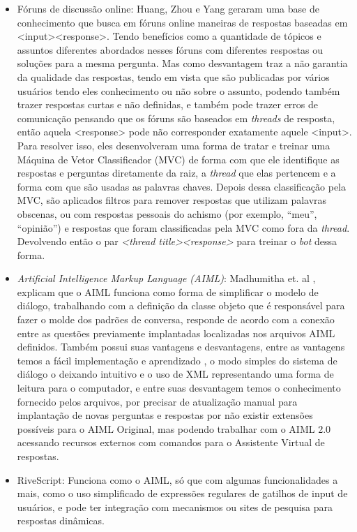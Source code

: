 \documentclass[
	12pt,				%
	oneside,
	a4paper,			%
	english,			%
	french,				%
	spanish,			%
	brazil				%
	]{abntex2}
\begin{document}
\begin{itemize}
	\item Fóruns de discussão online: Huang, Zhou e Yang\supercite{oline-foruns-database} geraram uma base de conhecimento que busca em fóruns online maneiras de respostas baseadas em <input><response>. Tendo benefícios como a quantidade de tópicos e assuntos diferentes abordados nesses fóruns com diferentes respostas ou soluções para a mesma pergunta. Mas como desvantagem traz a não garantia da qualidade das respostas, tendo em vista que são publicadas por vários usuários tendo eles conhecimento ou não sobre o assunto, podendo também trazer respostas curtas e não definidas, e também pode trazer erros de comunicação pensando que os fóruns são baseados em \emph{threads} de resposta, então aquela <response> pode não corresponder exatamente aquele <input>. Para resolver isso, eles desenvolveram uma forma de tratar e treinar uma Máquina de Vetor Classificador (MVC) de forma com que ele identifique as respostas e perguntas diretamente da raiz, a \emph{thread} que elas pertencem e a forma com que são usadas as palavras chaves. Depois dessa classificação pela MVC, são aplicados filtros para remover respostas que utilizam palavras obscenas, ou com respostas pessoais do achismo (por exemplo, “meu”, “opinião”) e respostas que foram classificadas pela MVC como fora da \emph{thread}. Devolvendo então o par \emph{<thread title><response>} para treinar o \emph{bot} dessa forma.

	\item \emph{Artificial Intelligence Markup Language (AIML)}: Madhumitha et. al \supercite{AIML}, explicam que o AIML funciona como forma de simplificar o modelo de diálogo, trabalhando com a definição da classe objeto que é responsável para fazer o molde dos padrões de conversa, responde de acordo com a conexão entre as questões previamente implantadas localizadas nos arquivos AIML definidos. Também possui suas vantagens e desvantagens, entre as vantagens temos a fácil implementação e aprendizado , o modo simples do sistema de diálogo o deixando intuitivo e o uso de XML representando uma forma de leitura para o computador, e entre suas desvantagem temos o conhecimento fornecido pelos arquivos, por precisar de atualização manual para implantação de novas perguntas e respostas por não existir extensões possíveis para o AIML Original, mas podendo trabalhar com o AIML 2.0 acessando recursos externos com comandos para o Assistente Virtual de respostas.
	\item RiveScript: Funciona como o AIML, só que com algumas funcionalidades a mais, como o uso simplificado de expressões regulares de gatilhos de input de usuários, e pode ter integração com mecanismos ou sites de pesquisa para respostas dinâmicas.
\end{itemize} 
\end{document}
